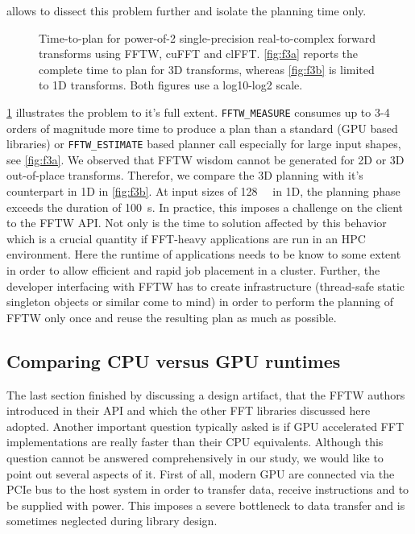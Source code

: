 \gearshifft{} allows to dissect this problem further and isolate the planning time only.

\begin{figure}[!tbp]
  \centering
  \hfill
  \caption{Time-to-plan for power-of-2 single-precision real-to-complex forward transforms using FFTW, cuFFT and clFFT. \cref{fig:f3a} reports the complete time to plan for 3D transforms, whereas \cref{fig:f3b} is limited to 1D transforms. Both figures use a log10-log2 scale.}
  \label{fig:plan_time_only}
\end{figure}

\cref{fig:plan_time_only} illustrates the problem to it's full extent. \texttt{FFTW\_MEASURE} consumes up to 3-4 orders of magnitude more time to produce a plan than a standard (GPU based libraries) or \texttt{FFTW\_ESTIMATE} based planner call especially for large input shapes, see \cref{fig:f3a}. We observed that FFTW wisdom cannot be generated for 2D or 3D out-of-place transforms. Therefor, we compare the 3D planning with it's counterpart in 1D in \cref{fig:f3b}. At input sizes of \SI{128}{\mebi\byte} in 1D, the planning phase exceeds the duration of \SI{100}{\second}. In practice, this imposes a challenge on the client to the FFTW API. Not only is the time to solution affected by this behavior which is a crucial quantity if FFT-heavy applications are run in an HPC environment. Here the runtime of applications needs to be know to some extent in order to allow efficient and rapid job placement in a cluster. Further, the developer interfacing with FFTW has to create infrastructure (thread-safe static singleton objects or similar come to mind) in order to perform the planning of FFTW only once and reuse the resulting plan as much as possible.

\subsection{Comparing CPU versus GPU runtimes}
\label{ssec:cpu_vs_gpu}

The last section finished by discussing a design artifact, that the FFTW authors introduced in their API and which the other FFT libraries discussed here adopted. Another important question typically asked is if GPU accelerated FFT implementations are really faster than their CPU equivalents. Although this question cannot be answered comprehensively in our study, we would like to point out several aspects of it. First of all, modern GPU are connected via the PCIe bus to the host system in order to transfer data, receive instructions and to be supplied with power. This imposes a severe bottleneck to data transfer and is sometimes neglected during library design. 

